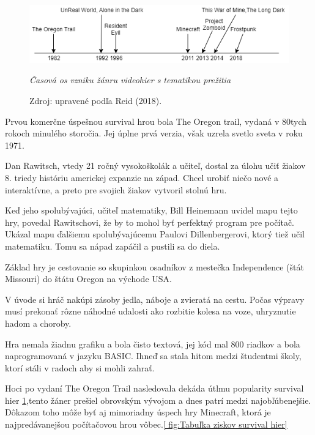 \documentclass[10pt,oneoside,slovak,a4paper]{article}
\begin{document}
\begin{figure}[h]
	\begin{flushleft}
		
		\hspace*{-0.1cm}\includegraphics[width=12.5cm,keepaspectratio]{diagram.png}
		\caption{\textit{Časová os vzniku žánru videohier s tematikou prežitia}}
		\label{ fig:Časová os vzniku žánru videohier s tematikou prežitia}
  		\caption*{Zdroj: upravené podľa Reid (2018). \cite{Reid}}
		
	\end{flushleft}
\end{figure}

Prvou komerčne úspešnou survival hrou bola The Oregon trail, vydaná v 80tych rokoch minulého storočia. Jej úplne prvá verzia, však uzrela svetlo sveta v roku 1971. 

Dan Rawitsch, vtedy 21 ročný vysokoškolák a učiteľ, dostal za úlohu učiť žiakov 8. triedy históriu americkej expanzie na západ. Chcel urobiť niečo nové a interaktívne, a preto pre svojich žiakov vytvoril stolnú hru. \cite{Toppo}

Keď jeho spolubývajúci, učiteľ matematiky,  Bill Heinemann uvidel mapu tejto hry, povedal Rawitschovi, že by to mohol byť perfektný program pre počítač. Ukázal mapu ďalšiemu spolubývajúcemu Paulovi Dillenbergerovi, ktorý tiež učil matematiku. Tomu sa nápad zapáčil a pustili sa do diela. 

Základ hry je cestovanie so skupinkou osadníkov z mestečka Independence (štát Missouri) do štátu Oregon na východe  USA.

V úvode si hráč nakúpi zásoby jedla, náboje a zvieratá na cestu.  Počas výpravy musí prekonať rôzne náhodné udalosti ako rozbitie kolesa na voze, uhryznutie hadom a choroby.

Hra nemala žiadnu grafiku a bola čisto textová, jej kód mal 800 riadkov a bola naprogramovaná v jazyku BASIC. Ihneď sa stala hitom medzi študentmi školy, ktorí stáli v radoch aby si mohli zahrať. \cite{Toppo}

Hoci po vydaní The Oregon Trail nasledovala dekáda útlmu popularity survival hier \ref{ fig:Časová os vzniku žánru videohier s tematikou prežitia},tento žáner prešiel obrovským vývojom a dnes patrí medzi najobľúbenejšie. \cite{IGN}Dôkazom toho môže byť aj mimoriadny úspech hry Minecraft, ktorá je najpredávanejšou počítačovou hrou vôbec.\ref{ fig:Tabuľka ziskov survival hier}
\end{document}
